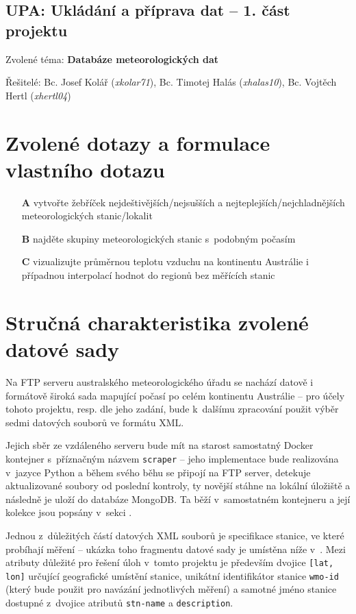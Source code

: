 \documentclass[10pt,a4paper,titlepage]{extarticle}
\begin{document}
\pagestyle{empty}
\begin{center}
	\section*{UPA: Ukládání a příprava dat -- 1. část projektu}
\end{center}

\large{Zvolené téma: \textbf{Databáze meteorologických dat}}

\large{
	Řešitelé:
	Bc. Josef Kolář (\textit{xkolar71}),
	Bc. Timotej Halás (\textit{xhalas10}),
	Bc. Vojtěch Hertl (\textit{xhertl04})
}%
\section{Zvolené dotazy a formulace vlastního dotazu}
\begin{itemize}
	\item[\textbf{A}] vytvořte žebříček nejdeštivějších/nejsušších a nejteplejších/nejchladnějších meteorologických stanic/lokalit
	\item[\textbf{B}] najděte skupiny meteorologických stanic s~podobným počasím
	\item[\textbf{C}] vizualizujte průměrnou teplotu vzduchu na kontinentu Austrálie i případnou interpolací hodnot
    do regionů bez měřících stanic
\end{itemize}%
\section{Stručná charakteristika zvolené datové sady}
Na FTP serveru australského meteorologického úřadu se nachází datově i formátově široká sada mapující počasí po celém
kontinentu Austrálie -- pro účely tohoto projektu, resp. dle jeho zadání, bude k~dalšímu zpracování použit výběr sedmi
datových souborů ve formátu XML.

Jejich sběr ze vzdáleného serveru bude mít na starost samostatný Docker kontejner s~příznačným názvem
\texttt{scraper} -- jeho implementace bude realizována v~jazyce Python a během svého běhu se připojí na FTP server,
detekuje aktualizované soubory od poslední kontroly, ty novější stáhne na lokální úložiště a následně je uloží
do databáze MongoDB. Ta běží v~samostatném kontejneru a její kolekce jsou popsány v~sekci
.

Jednou z~důležitých částí datových XML souborů je specifikace stanice, ve které probíhají měření -- ukázka toho
fragmentu datové sady je umístěna níže v~. Mezi atributy důležité pro řešení úloh
v~tomto projektu je především dvojice \mbox{\texttt{[lat, lon]}} určující geografické umístění stanice, unikátní
identifikátor stanice \texttt{wmo-id} (který bude použit pro navázání jednotlivých měření) a samotné jméno stanice
dostupné z~dvojice atributů \texttt{stn-name} a \texttt{description}.
\end{document}
